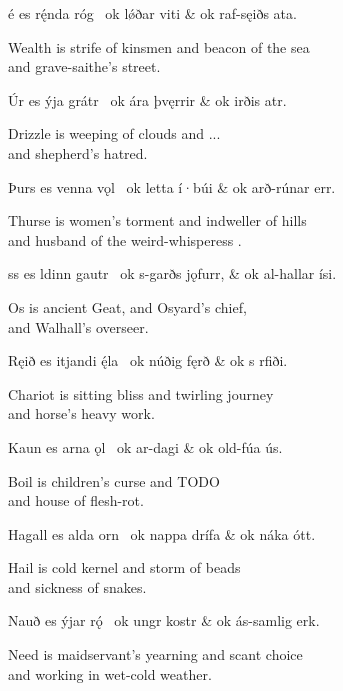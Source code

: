 \sectionline

\bvg\bva%
é es rę́nda róg \hld\ ok lǿðar viti &
\ind ok raf-sęiðs ata.\eva

\bvb Wealth is strife of kinsmen and beacon of the sea \\
\ind and grave-saithe’s  street.\evb\evg


\bvg\bva%
Úr es ýja grátr \hld\ ok ára þvęrrir &
\ind ok irðis atr.\eva

\bvb Drizzle is weeping of clouds and ... \\
\ind and shepherd’s hatred.\evb\evg


\bvg\bva%
Þurs es venna vǫl \hld\ ok letta í·búi &
\ind ok arð-rúnar err.\eva

\bvb Thurse is women’s torment and indweller of hills \\
\ind and husband of the weird-whisperess .\evb\evg


\bvg\bva%
ss es ldinn gautr \hld\ ok s-garðs jǫfurr, &
\ind ok al-hallar ísi.\eva

\bvb Os is ancient Geat, and Osyard’s chief, \\
\ind and Walhall’s overseer.\evb\evg


\bvg\bva%
Ręið es itjandi ę́la \hld\ ok núðig fęrð &
\ind ok s rfiði.\eva

\bvb Chariot is sitting bliss and twirling journey \\
\ind and horse’s heavy work.\evb\evg


\bvg\bva%
Kaun es arna ǫl \hld\ ok ar-dagi &
\ind ok old-fúa ús.\eva

\bvb Boil is children’s curse and TODO \\
\ind and house of flesh-rot.\evb\evg


\bvg\bva%
Hagall es alda orn \hld\ ok nappa drífa &
\ind ok náka ótt.\eva

\bvb Hail is cold kernel and storm of beads \\
\ind and sickness of snakes.\evb\evg


\bvg\bva%
Nauð es ýjar rǫ́ \hld\ ok ungr kostr &
\ind ok ás-samlig erk.\eva

\bvb Need is maidservant’s yearning and scant choice \\
\ind and working in wet-cold weather.\evb\evg


